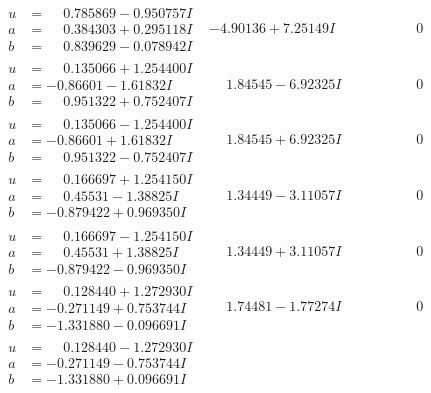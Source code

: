 \documentclass[1p]{elsarticle_modified}
\theoremstyle{definition}
\begin{document}
$$\begin{array}{c|c|c}
\begin{aligned}
u &= \phantom{-}0.785869 - 0.950757 I \\
a &= \phantom{-}0.384303 + 0.295118 I \\
b &= \phantom{-}0.839629 - 0.078942 I\end{aligned}
 & -4.90136 + 7.25149 I & \phantom{-0.000000 } 0 \\ \hline\begin{aligned}
u &= \phantom{-}0.135066 + 1.254400 I \\
a &= -0.86601 - 1.61832 I \\
b &= \phantom{-}0.951322 + 0.752407 I\end{aligned}
 & \phantom{-}1.84545 - 6.92325 I & \phantom{-0.000000 } 0 \\ \hline\begin{aligned}
u &= \phantom{-}0.135066 - 1.254400 I \\
a &= -0.86601 + 1.61832 I \\
b &= \phantom{-}0.951322 - 0.752407 I\end{aligned}
 & \phantom{-}1.84545 + 6.92325 I & \phantom{-0.000000 } 0 \\ \hline\begin{aligned}
u &= \phantom{-}0.166697 + 1.254150 I \\
a &= \phantom{-}0.45531 - 1.38825 I \\
b &= -0.879422 + 0.969350 I\end{aligned}
 & \phantom{-}1.34449 - 3.11057 I & \phantom{-0.000000 } 0 \\ \hline\begin{aligned}
u &= \phantom{-}0.166697 - 1.254150 I \\
a &= \phantom{-}0.45531 + 1.38825 I \\
b &= -0.879422 - 0.969350 I\end{aligned}
 & \phantom{-}1.34449 + 3.11057 I & \phantom{-0.000000 } 0 \\ \hline\begin{aligned}
u &= \phantom{-}0.128440 + 1.272930 I \\
a &= -0.271149 + 0.753744 I \\
b &= -1.331880 - 0.096691 I\end{aligned}
 & \phantom{-}1.74481 - 1.77274 I & \phantom{-0.000000 } 0 \\ \hline\begin{aligned}
u &= \phantom{-}0.128440 - 1.272930 I \\
a &= -0.271149 - 0.753744 I \\
b &= -1.331880 + 0.096691 I\end{aligned}

\end{array}$$
\end{document}
